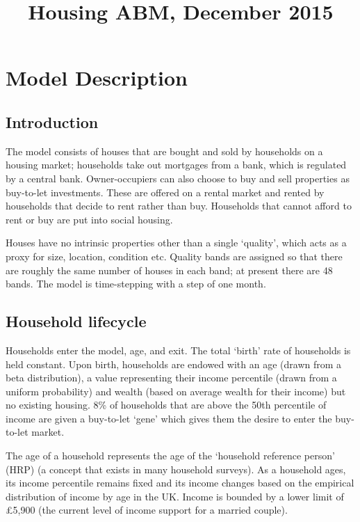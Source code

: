 \documentclass{report}
\begin{document}
\title{Housing ABM, December 2015}
\maketitle
\tableofcontents
\chapter{Model Description}

\section{Introduction}
The model consists of houses that are bought and sold by households on a housing market; households take out mortgages from a bank, which is regulated by a central bank. Owner-occupiers can also choose to buy and sell properties as buy-to-let investments. These are offered on a rental market and rented by households that decide to rent rather than buy. Households that cannot afford to rent or buy are put into social housing.

Houses have no intrinsic properties other than a single `quality', which acts as a proxy for size, location, condition etc. Quality bands are assigned so that there are roughly the same number of houses in each band; at present there are 48 bands. The model is time-stepping with a step of one month.

\section{Household lifecycle}
\label{lifecycle}
Households enter the model, age, and exit. The total `birth' rate of households is held constant. Upon birth, households are endowed with an age (drawn from a beta distribution), a value representing their income percentile (drawn from a uniform probability) and wealth (based on average wealth for their income) but no existing housing. 8\% of households that are above the 50th percentile of income are given a buy-to-let `gene' which gives them the desire to enter the buy-to-let market.

The age of a household represents the age of the `household reference person' (HRP) (a concept that exists in many household surveys). As a household ages, its income percentile remains fixed and its income changes based on the empirical distribution of income by age in the UK. Income is bounded by a lower limit of \pounds 5,900 (the current level of income support for a married couple).
\end{document}
